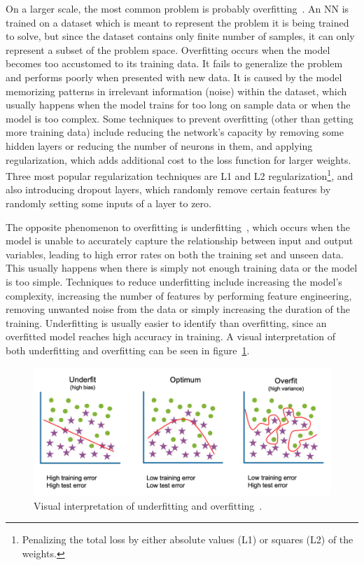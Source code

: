 On a larger scale, the most common problem is probably overfitting~\cite[p. 104]{Deep-learning-with-Python}.
An NN is trained on a dataset which is meant to represent the problem it is being trained to solve,
but since the dataset contains only finite number of samples, it can only represent
a subset of the problem space. Overfitting occurs when the model becomes too accustomed
to its training data. It fails to generalize the problem and performs poorly when presented with new data.
It is caused by the model memorizing patterns in irrelevant information (noise) within the dataset,
which usually happens when the model trains for too long on sample data or when the model is too complex.
Some techniques to prevent overfitting (other than getting more training data)
include reducing the network's capacity by removing some hidden layers
or reducing the number of neurons in them, and applying regularization, which adds additional cost to the loss
function for larger weights. Three most popular regularization techniques are L1 and L2
regularization\footnote{Penalizing the total loss by either absolute values (L1) or squares (L2)
of the weights.}, and also introducing dropout layers,
which randomly remove certain features by randomly setting some inputs of a layer to zero.

The opposite phenomenon to overfitting is underfitting~\cite[p. 104]{Deep-learning-with-Python},
which occurs when the model is unable to accurately capture the relationship between input and output variables,
leading to high error rates on both the training set and unseen data.
This usually happens when there is simply not enough training data or the model is too simple.
Techniques to reduce underfitting include increasing the model's complexity, increasing the number of
features by performing feature engineering, removing unwanted noise from the data or simply
increasing the duration of the training.
Underfitting is usually easier to identify than overfitting,
since an overfitted model reaches high accuracy in training.
A visual interpretation of both underfitting and overfitting can be seen %
in figure~\ref{fig:underfitting-overfitting}.

\begin{figure}[!ht]
    \centering
    \includegraphics[width=\linewidth]{obrazky-figures/underfitting_overfitting.png}
    \caption{Visual interpretation of underfitting and overfitting~\cite{IBM-overfitting}.}
    \label{fig:underfitting-overfitting}
\end{figure}




